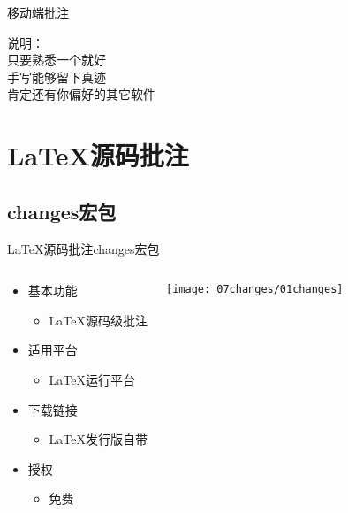 \documentclass[fontset = none, t, aspectratio=169]{ctexbeamer}
\begin{document}
\begin{frame}[c]{移动端批注}
  \begin{center}
    \begin{spacing}{1.8}
      说明：\\
      只要\alert{熟悉一个}就好\\
      手写能够留下\alert{真迹}\\
      肯定还有你偏好的其它软件
    \end{spacing}
  \end{center}
\end{frame}

\section{\LaTeX 源码批注}
\subsection{changes宏包}

\begin{frame}{\LaTeX 源码批注}{changes宏包}
  \begin{columns}[T,onlytextwidth]
    \begin{spacing}{1.8}
      \begin{itemize}
        \item 基本功能
          \begin{itemize}
            \item \LaTeX 源码级批注
          \end{itemize}
        \item 适用平台
          \begin{itemize}
            \item \LaTeX 运行平台
          \end{itemize}
        \item 下载链接
          \begin{itemize}
            \item \LaTeX 发行版自带
          \end{itemize}
        \item 授权
          \begin{itemize}
            \item \alert{免费}
          \end{itemize}
      \end{itemize}
    \end{spacing}
    \centering
    \texttt{[image: 07changes/01changes]}
  \end{columns}
\end{frame}
\end{document}
